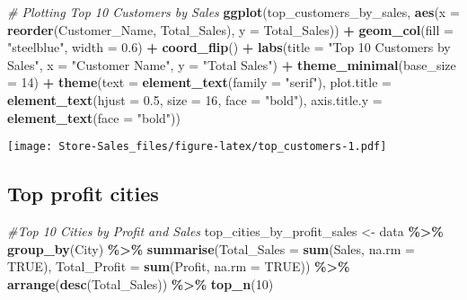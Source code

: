 \documentclass[
]{article}
\newenvironment{Shaded}{\begin{snugshade}}{\end{snugshade}}
\newcommand{\AttributeTok}[1]{\textcolor[rgb]{0.13,0.29,0.53}{#1}}
\newcommand{\CommentTok}[1]{\textcolor[rgb]{0.56,0.35,0.01}{\textit{#1}}}
\newcommand{\ConstantTok}[1]{\textcolor[rgb]{0.56,0.35,0.01}{#1}}
\newcommand{\DecValTok}[1]{\textcolor[rgb]{0.00,0.00,0.81}{#1}}
\newcommand{\FloatTok}[1]{\textcolor[rgb]{0.00,0.00,0.81}{#1}}
\newcommand{\FunctionTok}[1]{\textcolor[rgb]{0.13,0.29,0.53}{\textbf{#1}}}
\newcommand{\NormalTok}[1]{#1}
\newcommand{\OtherTok}[1]{\textcolor[rgb]{0.56,0.35,0.01}{#1}}
\newcommand{\SpecialCharTok}[1]{\textcolor[rgb]{0.81,0.36,0.00}{\textbf{#1}}}
\newcommand{\StringTok}[1]{\textcolor[rgb]{0.31,0.60,0.02}{#1}}
\begin{document}
\begin{Shaded}
\begin{Highlighting}[]
\CommentTok{\# Plotting Top 10 Customers by Sales}
\FunctionTok{ggplot}\NormalTok{(top\_customers\_by\_sales, }\FunctionTok{aes}\NormalTok{(}\AttributeTok{x =} \FunctionTok{reorder}\NormalTok{(Customer\_Name, Total\_Sales), }\AttributeTok{y =}\NormalTok{ Total\_Sales)) }\SpecialCharTok{+}
  \FunctionTok{geom\_col}\NormalTok{(}\AttributeTok{fill =} \StringTok{"steelblue"}\NormalTok{, }\AttributeTok{width =} \FloatTok{0.6}\NormalTok{) }\SpecialCharTok{+}
  \FunctionTok{coord\_flip}\NormalTok{() }\SpecialCharTok{+}
  \FunctionTok{labs}\NormalTok{(}\AttributeTok{title =} \StringTok{"Top 10 Customers by Sales"}\NormalTok{, }\AttributeTok{x =} \StringTok{"Customer Name"}\NormalTok{, }\AttributeTok{y =} \StringTok{"Total Sales"}\NormalTok{) }\SpecialCharTok{+}
  \FunctionTok{theme\_minimal}\NormalTok{(}\AttributeTok{base\_size =} \DecValTok{14}\NormalTok{) }\SpecialCharTok{+}
  \FunctionTok{theme}\NormalTok{(}\AttributeTok{text =} \FunctionTok{element\_text}\NormalTok{(}\AttributeTok{family =} \StringTok{"serif"}\NormalTok{),}
        \AttributeTok{plot.title =} \FunctionTok{element\_text}\NormalTok{(}\AttributeTok{hjust =} \FloatTok{0.5}\NormalTok{, }\AttributeTok{size =} \DecValTok{16}\NormalTok{, }\AttributeTok{face =} \StringTok{"bold"}\NormalTok{),}
        \AttributeTok{axis.title.y =} \FunctionTok{element\_text}\NormalTok{(}\AttributeTok{face =} \StringTok{"bold"}\NormalTok{))}
\end{Highlighting}
\end{Shaded}

\texttt{[image: Store-Sales\_files/figure-latex/top\_customers-1.pdf]}

\hypertarget{top-profit-cities}{%
\subsection{Top profit cities}\label{top-profit-cities}}

\begin{Shaded}
\begin{Highlighting}[]
\CommentTok{\#Top 10 Cities by Profit and Sales}
\NormalTok{top\_cities\_by\_profit\_sales }\OtherTok{\textless{}{-}}\NormalTok{ data }\SpecialCharTok{\%\textgreater{}\%}
  \FunctionTok{group\_by}\NormalTok{(City) }\SpecialCharTok{\%\textgreater{}\%}
  \FunctionTok{summarise}\NormalTok{(}\AttributeTok{Total\_Sales =} \FunctionTok{sum}\NormalTok{(Sales, }\AttributeTok{na.rm =} \ConstantTok{TRUE}\NormalTok{), }\AttributeTok{Total\_Profit =} \FunctionTok{sum}\NormalTok{(Profit, }\AttributeTok{na.rm =} \ConstantTok{TRUE}\NormalTok{)) }\SpecialCharTok{\%\textgreater{}\%}
  \FunctionTok{arrange}\NormalTok{(}\FunctionTok{desc}\NormalTok{(Total\_Sales)) }\SpecialCharTok{\%\textgreater{}\%}
  \FunctionTok{top\_n}\NormalTok{(}\DecValTok{10}\NormalTok{)}
\end{Highlighting}
\end{Shaded}
\end{document}
